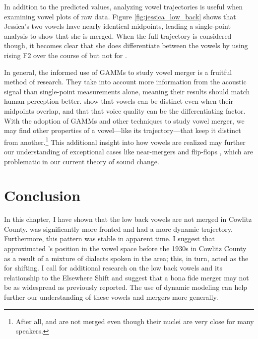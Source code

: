 In addition to the predicted values, analyzing vowel trajectories is useful when examining vowel plots of raw data. Figure \ref{fig:jessica_low_back} shows that Jessica's two vowels have nearly identical midpoints, leading a single-point analysis to show that she is merged. When the full trajectory is considered though, it becomes clear that she does differentiate between the vowels by using rising F2 over the course of \thought but not for \lot.

In general, the informed use of GAMMs to study vowel merger is a fruitful method of research. They take into account more information from the acoustic signal than single-point measurements alone, meaning their results should match human perception better. \citet{dipaolo_faber_1990} show that vowels can be distinct even when their midpoints overlap, and that that voice quality can be the differentiating factor. With the adoption of GAMMs and other techniques to study vowel merger, we may find other properties of a vowel---like its trajectory---that keep it distinct from another.\footnote{After all, \price and \mouth are not merged even though their nuclei are very close for many speakers.} This additional insight into how vowels are realized may further our understanding of exceptional cases like near-mergers and flip-flops \citep{hall_lew_2013}, which are problematic in our current theory of sound change.

\section{Conclusion}

In this chapter, I have shown that the low back vowels are not merged in Cowlitz County. \lot was significantly more fronted and \thought had a more dynamic trajectory. Furthermore, this pattern was stable in apparent time. I suggest that \lot approximated \thought's position in the vowel space before the 1930s in Cowlitz County as a result of a mixture of dialects spoken in the area; this, in turn, acted as the for \trap shifting. I call for additional research on the low back vowels and its relationship to the Elsewhere Shift and suggest that a bona fide merger may not be as widespread as previously reported. The use of dynamic modeling can help further our understanding of these vowels and mergers more generally.
